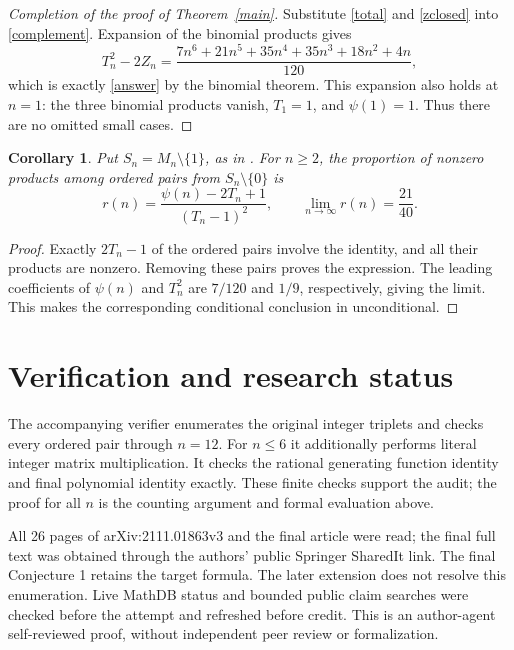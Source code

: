 \documentclass[11pt]{article}
\newtheorem{corollary}{Corollary}
\begin{document}
\begin{proof}[Completion of the proof of Theorem~\ref{main}]
Substitute \eqref{total} and \eqref{zclosed} into \eqref{complement}.
Expansion of the binomial products gives
\[
 T_n^2-2Z_n
 =\frac{7n^6+21n^5+35n^4+35n^3+18n^2+4n}{120},
\]
which is exactly \eqref{answer} by the binomial theorem. This expansion
also holds at $n=1$: the three binomial products vanish, $T_1=1$, and
$\psi(1)=1$. Thus there are no omitted small cases.
\end{proof}

\begin{corollary}
Put $S_n=M_n\setminus\{1\}$, as in \cite{FF}. For $n\ge2$, the proportion
of nonzero products among ordered pairs from $S_n\setminus\{0\}$ is
\[
 r(n)=\frac{\psi(n)-2T_n+1}{(T_n-1)^2},\qquad
 \lim_{n\to\infty}r(n)=\frac{21}{40}.
\]
\end{corollary}
\begin{proof}
Exactly $2T_n-1$ of the ordered pairs involve the identity, and all
their products are nonzero. Removing these pairs proves the expression.
The leading coefficients of $\psi(n)$ and $T_n^2$ are $7/120$ and
$1/9$, respectively, giving the limit. This makes the corresponding
conditional conclusion in \cite{FF} unconditional.
\end{proof}

\section*{Verification and research status}
The accompanying verifier enumerates the original integer triplets and
checks every ordered pair through $n=12$. For $n\le6$ it additionally
performs literal integer matrix multiplication. It checks the rational
generating function identity and final polynomial identity exactly.
These finite checks support the audit; the proof for all $n$ is the
counting argument and formal evaluation above.

All 26 pages of arXiv:2111.01863v3 and the final article were read; the
final full text was obtained through the authors' public Springer
SharedIt link. The final Conjecture 1 retains the target formula.
The later extension \cite{extension} does not resolve this enumeration.
Live MathDB status and bounded public claim searches were checked
before the attempt and refreshed before credit. This is an author-agent
self-reviewed proof, without independent peer review or formalization.
\end{document}
